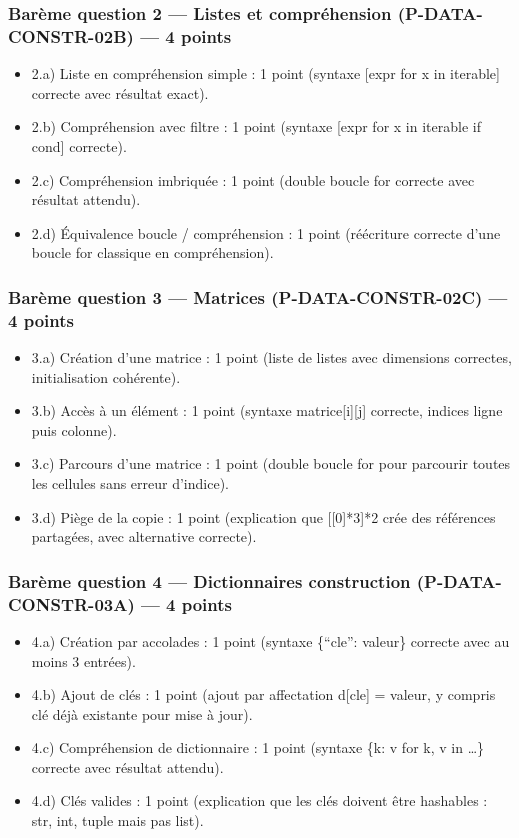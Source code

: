 \subsubsection{Barème question 2 — Listes et compréhension (P-DATA-CONSTR-02B) — 4 points}

\begin{itemize}
\tightlist
\item
  2.a) Liste en compréhension simple : 1 point (syntaxe {[}expr for x in
  iterable{]} correcte avec résultat exact).
\item
  2.b) Compréhension avec filtre : 1 point (syntaxe {[}expr for x in
  iterable if cond{]} correcte).
\item
  2.c) Compréhension imbriquée : 1 point (double boucle for correcte
  avec résultat attendu).
\item
  2.d) Équivalence boucle / compréhension : 1 point (réécriture correcte
  d'une boucle for classique en compréhension).
\end{itemize}

\subsubsection{Barème question 3 — Matrices (P-DATA-CONSTR-02C) — 4 points}

\begin{itemize}
\tightlist
\item
  3.a) Création d'une matrice : 1 point (liste de listes avec dimensions
  correctes, initialisation cohérente).
\item
  3.b) Accès à un élément : 1 point (syntaxe matrice{[}i{]}{[}j{]}
  correcte, indices ligne puis colonne).
\item
  3.c) Parcours d'une matrice : 1 point (double boucle for pour
  parcourir toutes les cellules sans erreur d'indice).
\item
  3.d) Piège de la copie : 1 point (explication que {[}{[}0{]}*3{]}*2
  crée des références partagées, avec alternative correcte).
\end{itemize}

\subsubsection{Barème question 4 — Dictionnaires construction (P-DATA-CONSTR-03A) — 4 points}

\begin{itemize}
\tightlist
\item
  4.a) Création par accolades : 1 point (syntaxe \{``cle'': valeur\}
  correcte avec au moins 3 entrées).
\item
  4.b) Ajout de clés : 1 point (ajout par affectation d{[}cle{]} =
  valeur, y compris clé déjà existante pour mise à jour).
\item
  4.c) Compréhension de dictionnaire : 1 point (syntaxe \{k: v for k, v
  in \ldots\} correcte avec résultat attendu).
\item
  4.d) Clés valides : 1 point (explication que les clés doivent être
  hashables : str, int, tuple mais pas list).
\end{itemize}

